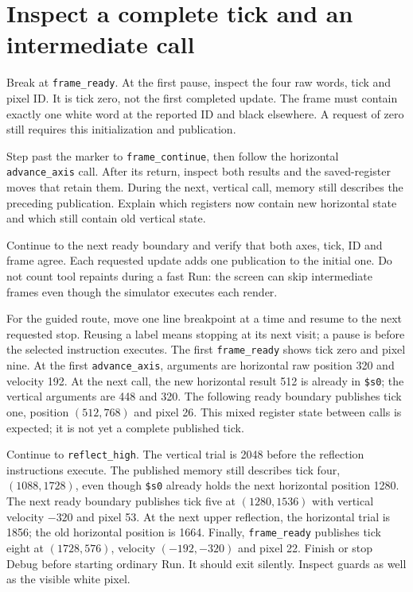 \section{Inspect a complete tick and an intermediate call}

Break at \texttt{frame\_ready}. At the first pause, inspect the four raw words,
tick and pixel ID. It is tick zero, not the first completed update. The frame must
contain exactly one white word at the reported ID and black elsewhere. A request
of zero still requires this initialization and publication.

Step past the marker to \texttt{frame\_continue}, then follow the horizontal
\texttt{advance\_axis} call. After its return, inspect both results and the
saved-register moves that retain them. During the next, vertical call, memory
still describes the preceding publication. Explain which registers now contain
new horizontal state and which still contain old vertical state.

Continue to the next ready boundary and verify that both axes, tick, ID and
frame agree. Each requested update adds one publication to the initial one.
Do not count tool repaints during a fast Run: the screen can skip intermediate
frames even though the simulator executes each render.

For the guided route, move one line breakpoint at a time and resume to the
next requested stop. Reusing a label means stopping at its next visit; a pause
is before the selected instruction executes. The first \texttt{frame\_ready}
shows tick zero and pixel nine. At the first \texttt{advance\_axis}, arguments
are horizontal raw position 320 and velocity 192. At the next call, the new
horizontal result 512 is already in \texttt{\$s0}; the vertical arguments are
448 and 320. The following ready boundary publishes tick one, position
$(512,768)$ and pixel 26. This mixed register state between calls is expected;
it is not yet a complete published tick.

Continue to \texttt{reflect\_high}. The vertical trial is 2048 before the
reflection instructions execute. The published memory still describes tick
four, $(1088,1728)$, even though \texttt{\$s0} already holds the next horizontal
position 1280. The next ready boundary publishes tick five at $(1280,1536)$
with vertical velocity $-320$ and pixel 53. At the next upper reflection,
the horizontal trial is 1856; the old horizontal position is 1664. Finally,
\texttt{frame\_ready} publishes tick eight at $(1728,576)$, velocity
$(-192,-320)$ and pixel 22. Finish or stop Debug before starting ordinary Run.
It should exit silently. Inspect guards as well as the visible white pixel.

